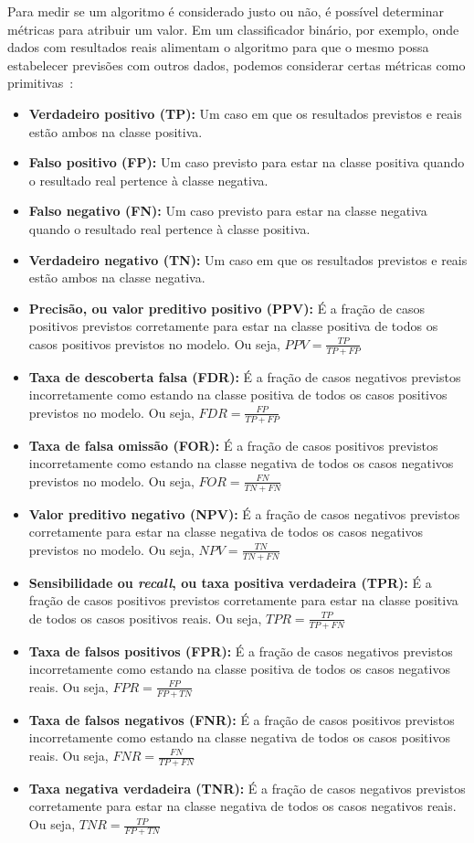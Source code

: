 \documentclass[portugues, 12pt, a4paper]{article}
\begin{document}
Para medir se um algoritmo é considerado justo ou não, é possível determinar métricas para atribuir um valor. Em um classificador binário, por exemplo, onde dados com resultados reais alimentam o algoritmo para que o mesmo possa estabelecer previsões com outros dados, podemos considerar certas métricas como primitivas~\citep{Verma_2018}:

\begin{itemize}
\item \textbf{Verdadeiro positivo (TP):} Um caso em que os resultados previstos e reais estão ambos na classe positiva.
\item \textbf{Falso positivo (FP):} Um caso previsto para estar na classe positiva
quando o resultado real pertence à classe negativa.
\item \textbf{Falso negativo (FN):} Um caso previsto para estar na classe negativa
quando o resultado real pertence à classe positiva.
\item \textbf{Verdadeiro negativo (TN):} Um caso em que os resultados previstos e reais estão ambos na classe negativa.
\item \textbf{Precisão, ou valor preditivo positivo (PPV):} É a fração de casos positivos previstos corretamente para estar na classe positiva de todos os casos positivos previstos no modelo. Ou seja, $PPV = \frac{TP}{TP + FP}$
\item \textbf{Taxa de descoberta falsa (FDR):} É a fração de casos negativos previstos incorretamente como estando na classe positiva de todos os casos positivos previstos no modelo. Ou seja, $FDR  = \frac{FP}{TP + FP}$
\item \textbf{Taxa de falsa omissão (FOR):} É a fração de casos positivos previstos incorretamente como estando na classe negativa de todos os casos negativos previstos no modelo. Ou seja, $FOR = \frac{FN}{TN + FN}$
\item \textbf{Valor preditivo negativo (NPV):} É a fração de casos negativos previstos corretamente para estar na classe negativa de todos os casos negativos previstos no modelo. Ou seja, $NPV = \frac{TN}{TN + FN}$
\item \textbf{Sensibilidade ou \textit{recall}, ou taxa positiva verdadeira (TPR):} É a fração de casos positivos previstos corretamente para estar na classe positiva de todos os casos positivos reais. Ou seja, $TPR = \frac{TP}{TP + FN}$
\item \textbf{Taxa de falsos positivos (FPR):} É a fração de casos negativos previstos incorretamente como estando na classe positiva de todos os casos negativos reais. Ou seja, $FPR = \frac{FP}{FP + TN}$
\item \textbf{Taxa de falsos negativos (FNR):} É a fração de casos positivos previstos incorretamente como estando na classe negativa de todos os casos positivos reais. Ou seja, $FNR = \frac{FN}{TP + FN}$
\item \textbf{Taxa negativa verdadeira (TNR):} É a fração de casos negativos previstos corretamente para estar na classe negativa de todos os casos negativos reais. Ou seja, $TNR = \frac{TP}{FP + TN}$
\end{itemize}
\end{document}

